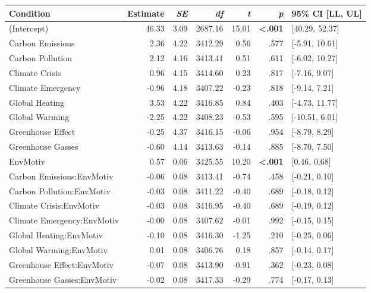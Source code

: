 \begin{table}[ht]
\centering
\begin{tabular}{lrrrrrl}
  \hline
Condition & Estimate & \textit{SE} & \textit{df} & \textit{t} & \textit{p} & 95\% CI [LL, UL] \\ 
  \hline
(Intercept) & 46.33 & 3.09 & 2687.16 & 15.01 & \textbf{\textless  .001} & [40.29, 52.37] \\ 
  Carbon Emissions & 2.36 & 4.22 & 3412.29 & 0.56 & .577 & [-5.91, 10.61] \\ 
  Carbon Pollution & 2.12 & 4.16 & 3413.41 & 0.51 & .611 & [-6.02, 10.27] \\ 
  Climate Crisis & 0.96 & 4.15 & 3414.60 & 0.23 & .817 & [-7.16, 9.07] \\ 
  Climate Emergency & -0.96 & 4.18 & 3407.22 & -0.23 & .818 & [-9.14, 7.21] \\ 
  Global Heating & 3.53 & 4.22 & 3416.85 & 0.84 & .403 & [-4.73, 11.77] \\ 
  Global Warming & -2.25 & 4.22 & 3408.23 & -0.53 & .595 & [-10.51, 6.01] \\ 
  Greenhouse Effect & -0.25 & 4.37 & 3416.15 & -0.06 & .954 & [-8.79, 8.29] \\ 
  Greenhouse Gasses & -0.60 & 4.14 & 3413.63 & -0.14 & .885 & [-8.70, 7.50] \\ 
  EnvMotiv & 0.57 & 0.06 & 3425.55 & 10.20 & \textbf{\textless  .001} & [0.46, 0.68] \\ 
  Carbon Emissions:EnvMotiv & -0.06 & 0.08 & 3413.41 & -0.74 & .458 & [-0.21, 0.10] \\ 
  Carbon Pollution:EnvMotiv & -0.03 & 0.08 & 3411.22 & -0.40 & .689 & [-0.18, 0.12] \\ 
  Climate Crisis:EnvMotiv & -0.03 & 0.08 & 3416.95 & -0.40 & .689 & [-0.19, 0.12] \\ 
  Climate Emergency:EnvMotiv & -0.00 & 0.08 & 3407.62 & -0.01 & .992 & [-0.15, 0.15] \\ 
  Global Heating:EnvMotiv & -0.10 & 0.08 & 3416.30 & -1.25 & .210 & [-0.25, 0.06] \\ 
  Global Warming:EnvMotiv & 0.01 & 0.08 & 3406.76 & 0.18 & .857 & [-0.14, 0.17] \\ 
  Greenhouse Effect:EnvMotiv & -0.07 & 0.08 & 3413.90 & -0.91 & .362 & [-0.23, 0.08] \\ 
  Greenhouse Gasses:EnvMotiv & -0.02 & 0.08 & 3417.33 & -0.29 & .774 & [-0.17, 0.13] \\ 
   \hline
\end{tabular}
\end{table}

